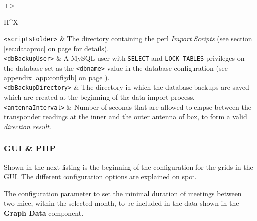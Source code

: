 \documentclass[a4paper,10pt,twoside,titlepage,headings=small,bibliography=totocnumbered,headsepline]{scrartcl}
\begin{document}
\begin{appendix}


\begin{center} 
\renewcommand\arraystretch{2}
\begin{tabularx}{\textwidth}{+>{\raggedright\arraybackslash}H^X}
\lstinline|<scriptsFolder>|	&	The directory containing the perl \textit{Import Scripts} (see section \ref{sec:dataproc} on page \pageref{sec:dataproc} for details). \\ 
\lstinline|<dbBackupUser>|	&	A MySQL user with \lstinline|SELECT| and \lstinline|LOCK TABLES| privileges on the database set as the \lstinline|<dbname>| value in the database configuration (see appendix \ref{app:configdb} on page \pageref{app:configdb}). \\ 
\lstinline|<dbBackupDirectory>|	&	The directory in which the database backups are saved which are created at the beginning of the data import process. \\ 
\lstinline|<antennaInterval>|	&	 Number of seconds that are allowed to elapse between the transponder readings at the inner and the outer antenna of box, to form a valid \textit{direction result}.\\ 
\end{tabularx}
\label{tab:perl_config}
\end{center} 

\subsubsection{GUI \& PHP}
\label{app:configfrontend}




Shown in the next listing is the beginning of the configuration for the grids in the GUI. The different configuration options are explained on spot.



The configuration parameter to set the minimal duration of meetings between two mice, within the selected month, to be included in the data shown in the \textbf{Graph Data} component. 


\end{appendix}
\end{document}
